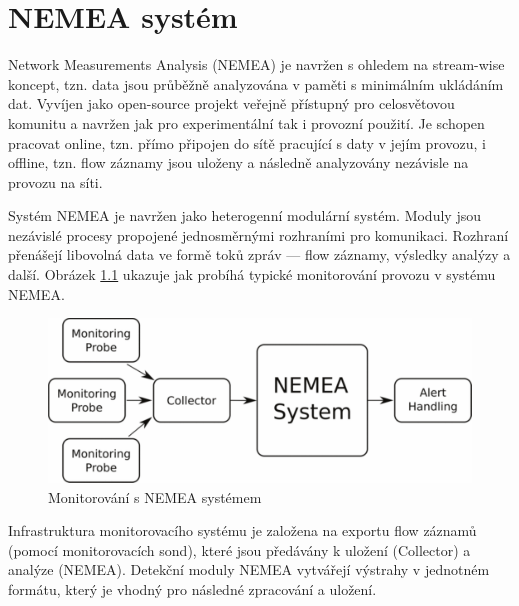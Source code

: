 \documentclass[thesis=B,czech,hidelinks]{FITthesis}[2019/03/21]
\begin{document}
\chapter{NEMEA systém} \label{NEMEAsystem}
Network Measurements Analysis (NEMEA) \cite{NEMEA} je navržen s ohledem na stream-wise koncept, tzn. data jsou průběžně analyzována v paměti s minimálním ukládáním dat. Vyvíjen jako open-source projekt veřejně přístupný pro celosvětovou komunitu a navržen jak pro experimentální tak i provozní použití. Je schopen pracovat online, tzn. přímo připojen do sítě pracující s daty v jejím provozu, i offline, tzn. flow záznamy jsou uloženy a následně analyzovány nezávisle na provozu na síti. 

Systém NEMEA \cite{NEMEA} je navržen jako heterogenní modulární systém. Moduly jsou nezávislé procesy propojené jednosměrnými rozhraními pro komunikaci. Rozhraní přenášejí libovolná data ve formě toků zpráv --- flow záznamy, výsledky analýzy a další. Obrázek \ref{NEMEA_typical_flow} ukazuje jak probíhá typické monitorování provozu v systému NEMEA. 
\begin{figure}
    \centering
    \includegraphics[width=\textwidth]{NEMEA1.pdf}
    \caption[Monitorování s NEMEA systémem]{Monitorování s NEMEA systémem \cite{NEMEA}}
    \label{NEMEA_typical_flow}
\end{figure}

\newpage
Infrastruktura monitorovacího systému je založena na exportu flow záznamů (pomocí monitorovacích sond), které jsou předávány k uložení (Collector) a analýze (NEMEA). Detekční moduly NEMEA vytvářejí výstrahy v jednotném formátu, který je vhodný pro následné zpracování a uložení.
\end{document}
